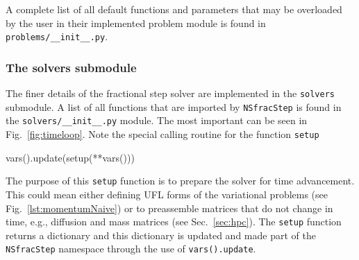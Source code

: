 \documentclass[final,3p,times,twocolumn]{elsarticle}
\newcommand{\inpyth}{\lstinline[style=inlinestyle]} %[]%
\begin{document}
A complete list of all default functions and parameters that may be overloaded by the user in their implemented problem module is found in \inpyth{problems/__init__.py}. 

%

\subsubsection*{The solvers submodule}

The finer details of the fractional step solver are implemented in the \inpyth{solvers} submodule. A list of all functions that are imported by \inpyth{NSfracStep} is found in the \inpyth{solvers/__init__.py} module. The most important can be seen in Fig.~\ref{fig:timeloop}. Note the special calling routine for the function \inpyth{setup}
\begin{python}
vars().update(setup(**vars()))
\end{python}
The purpose of this \inpyth{setup} function is to prepare the solver for time advancement. This could mean either defining UFL forms of the variational problems (see Fig.~\ref{lst:momentumNaive}) or to preassemble matrices that do not change in time, e.g., diffusion and mass matrices (see Sec.~\ref{sec:hpc}). The \inpyth{setup} function returns a dictionary and this dictionary is updated and made part of the \inpyth{NSfracStep} namespace through the use of \inpyth{vars().update}.
\end{document}
